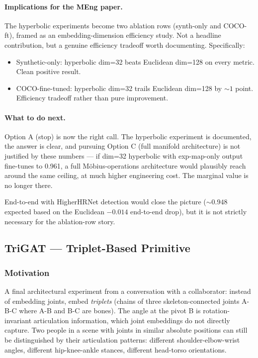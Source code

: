 \paragraph{Implications for the MEng paper.} The hyperbolic experiments become two ablation rows (synth-only and COCO-ft), framed as an embedding-dimension efficiency study. Not a headline contribution, but a genuine efficiency tradeoff worth documenting. Specifically:
\begin{itemize}
    \item Synthetic-only: hyperbolic dim=32 beats Euclidean dim=128 on every metric. Clean positive result.
    \item COCO-fine-tuned: hyperbolic dim=32 trails Euclidean dim=128 by $\sim 1$ point. Efficiency tradeoff rather than pure improvement.
\end{itemize}

\paragraph{What to do next.} Option A (stop) is now the right call. The hyperbolic experiment is documented, the answer is clear, and pursuing Option C (full manifold architecture) is not justified by these numbers --- if dim=32 hyperbolic with exp-map-only output fine-tunes to 0.961, a full M\"obius-operations architecture would plausibly reach around the same ceiling, at much higher engineering cost. The marginal value is no longer there.

End-to-end with HigherHRNet detection would close the picture ($\sim 0.948$ expected based on the Euclidean $-0.014$ end-to-end drop), but it is not strictly necessary for the ablation-row story.


\subsection{TriGAT --- Triplet-Based Primitive}

\subsubsection{Motivation}

A final architectural experiment from a conversation with a collaborator: instead of embedding joints, embed \emph{triplets} (chains of three skeleton-connected joints A-B-C where A-B and B-C are bones). The angle at the pivot B is rotation-invariant articulation information, which joint embeddings do not directly capture. Two people in a scene with joints in similar absolute positions can still be distinguished by their articulation patterns: different shoulder-elbow-wrist angles, different hip-knee-ankle stances, different head-torso orientations.

